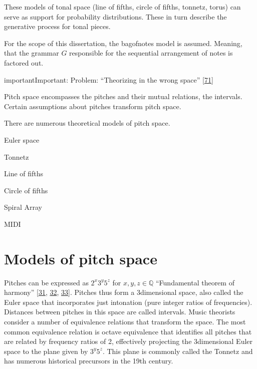 \documentclass[letterpaper,10pt,english]{sphinxmanual}
\begin{document}
\sphinxAtStartPar
These models of tonal space (line of fifths, circle of fifths, tonnetz,
torus) can serve as support for probability distributions. These in turn
describe the generative process for tonal pieces.

\sphinxAtStartPar
For the scope of this dissertation, the bag\sphinxhyphen{}of\sphinxhyphen{}notes model is assumed.
Meaning, that the grammar \(G\) responsible for the sequential
arrangement of notes is factored out.

\begin{sphinxadmonition}{important}{Important:}
\sphinxAtStartPar
Problem: “Theorizing in the wrong space” {[}\hyperlink{cite.8_bibliography:id10}{71}{]}
\end{sphinxadmonition}

\sphinxAtStartPar
Pitch space encompasses the pitches and their mutual relations, the
intervals. Certain assumptions about pitches transform pitch space.

\sphinxAtStartPar
There are numerous theoretical models of pitch space.

\begin{DUlineblock}{0em}
\item[] \sphinxhyphen{} Euler space
\item[] \sphinxhyphen{} Tonnetz
\item[] \sphinxhyphen{} Line of fifths
\item[] \sphinxhyphen{} Circle of fifths
\item[] \sphinxhyphen{} Spiral Array
\item[] \sphinxhyphen{} MIDI
\end{DUlineblock}


\section{Models of pitch space}
\label{\detokenize{5_notes:models-of-pitch-space}}
\sphinxAtStartPar
Pitches can be expressed as \(2^x3^y5^z\) for
\(x,y,z\in \mathbb Q\) “Fundamental theorem of harmony”
{[}\hyperlink{cite.8_bibliography:id48}{31}, \hyperlink{cite.8_bibliography:id49}{32}, \hyperlink{cite.8_bibliography:id47}{33}{]}.
Pitches thus form a
3\sphinxhyphen{}dimensional space, also called the Euler space that incorporates just
intonation (pure integer ratios of frequencies). Distances between
pitches in this space are called intervals. Music theorists consider a
number of equivalence relations that transform the space. The most
common equivalence relation is octave equivalence that identifies all
pitches that are related by frequency ratios of 2, effectively
projecting the 3\sphinxhyphen{}dimensional Euler space to the plane given by
\(3^y5^z\). This plane is commonly called the Tonnetz and has
numerous historical precursors in the 19th century.
\end{document}
